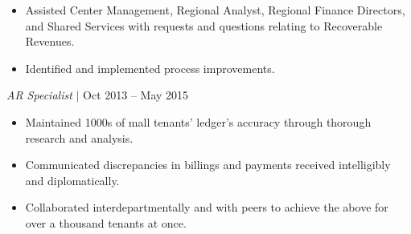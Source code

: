\documentclass[11pt]{res}%
\begin{document}
\begin{resume}
\begin{adjustwidth}{0.05\textwidth}{0.0\textwidth}
\begin{itemize}
\item%
Assisted Center Management, Regional Analyst, Regional Finance Directors, and Shared Services with requests and questions relating to Recoverable Revenues.%
\item%
Identified and implemented process improvements.%
\end{itemize}
\end{adjustwidth}%
\begin{adjustwidth}{0.05\textwidth}{0.0\textwidth}
\textit{AR Specialist} $|$ Oct 2013 -- May 2015
\vspace*{-0.010000\textwidth}
\begin{itemize}%
\setlength\itemsep{-0.2em}%
\item%
Maintained 1000s of mall tenants' ledger's accuracy through thorough research and analysis.%
\item%
Communicated discrepancies in billings and payments received intelligibly and diplomatically.%
\item%
Collaborated interdepartmentally and with peers to achieve the above for over a thousand tenants at once.%
\end{itemize}
\end{adjustwidth}



\end{resume}
\end{document}
